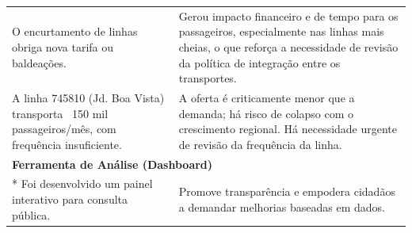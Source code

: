 \begin{longtable}[c]{
  p{}
  p{}
}
O encurtamento de linhas obriga nova tarifa ou baldeações. &
Gerou impacto financeiro e de tempo para os passageiros, especialmente nas linhas mais cheias, o que reforça a necessidade de revisão da política de integração entre os transportes. \\

A linha 745810 (Jd. Boa Vista) transporta ~150 mil passageiros/mês, com frequência insuficiente. &
A oferta é criticamente menor que a demanda; há risco de colapso com o crescimento regional. Há necessidade urgente de revisão da frequência da linha. \\

\midrule
\multicolumn{2}{l}{\textbf{Ferramenta de Análise (Dashboard)}} \\*
Foi desenvolvido um painel interativo para consulta pública. &
Promove transparência e empodera cidadãos a demandar melhorias baseadas em dados. \\

\end{longtable}
\endgroup






